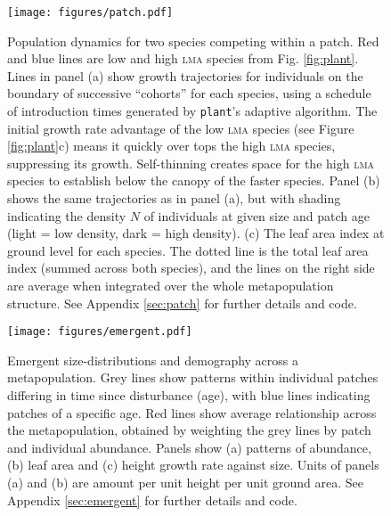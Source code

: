 \documentclass[a4paper,11pt]{article}
\newcommand{\plant}{\texttt{plant}}
\begin{document}
\newpage

\begin{figure}[h!]
\centering
\texttt{[image: figures/patch.pdf]}
\caption{Population dynamics for two species competing within a patch.
  Red and blue lines are low and high \textsc{lma} species from
  Fig. \ref{fig:plant}.  Lines in panel (a) show growth trajectories
  for individuals on the boundary of successive ``cohorts'' for each
  species, using a schedule of introduction times generated by
  {\plant}'s adaptive algorithm.  The initial growth rate advantage of
  the low \textsc{lma} species (see Figure \ref{fig:plant}c) means it
  quickly over tops the high \textsc{lma} species, suppressing its
  growth.  Self-thinning creates space for the high \textsc{lma}
  species to establish below the canopy of the faster species. Panel
  (b) shows the same trajectories as in panel (a), but with shading
  indicating the density $N$ of individuals at given size and patch
  age (light = low density, dark = high density).  (c) The leaf area
  index at ground level for each species.  The dotted line is the
  total leaf area index (summed across both species), and the lines on
  the right side are average when integrated over the whole
  metapopulation structure.  See Appendix \ref{sec:patch} for further
  details and code.}
\label{fig:patch}
\end{figure}

\newpage

\begin{figure}[h!]
\centering
\texttt{[image: figures/emergent.pdf]}
\caption{Emergent size-distributions and demography across a metapopulation.
Grey lines show patterns within individual patches differing in time
since disturbance (age), with blue lines indicating patches of a
specific age. Red lines show average relationship across the metapopulation, 
obtained by weighting the grey lines by patch and individual abundance. 
Panels show (a) patterns of abundance, (b) leaf area and
(c) height growth rate against size. Units of panels (a) and
(b) are amount per unit height per unit ground area.  
See Appendix \ref{sec:emergent} for further details and code.}
\label{fig:emergent}
\end{figure}

\newpage
\end{document}
